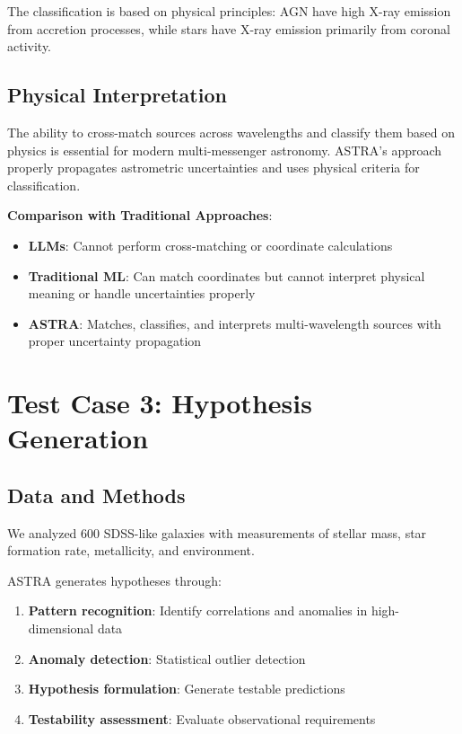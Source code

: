 \documentclass[usenatbib]{rasti}
\begin{document}
The classification is based on physical principles: AGN have high X-ray emission from accretion processes, while stars have X-ray emission primarily from coronal activity.

\subsection{Physical Interpretation}

The ability to cross-match sources across wavelengths and classify them based on physics is essential for modern multi-messenger astronomy. ASTRA's approach properly propagates astrometric uncertainties and uses physical criteria for classification.

\textbf{Comparison with Traditional Approaches}:
\begin{itemize}
\item \textbf{LLMs}: Cannot perform cross-matching or coordinate calculations
\item \textbf{Traditional ML}: Can match coordinates but cannot interpret physical meaning or handle uncertainties properly
\item \textbf{ASTRA}: Matches, classifies, and interprets multi-wavelength sources with proper uncertainty propagation
\end{itemize}

\section{Test Case 3: Hypothesis Generation}

\subsection{Data and Methods}

We analyzed 600 SDSS-like galaxies with measurements of stellar mass, star formation rate, metallicity, and environment.

ASTRA generates hypotheses through:
\begin{enumerate}
\item \textbf{Pattern recognition}: Identify correlations and anomalies in high-dimensional data
\item \textbf{Anomaly detection}: Statistical outlier detection
\item \textbf{Hypothesis formulation}: Generate testable predictions
\item \textbf{Testability assessment}: Evaluate observational requirements
\end{enumerate}
\end{document}
